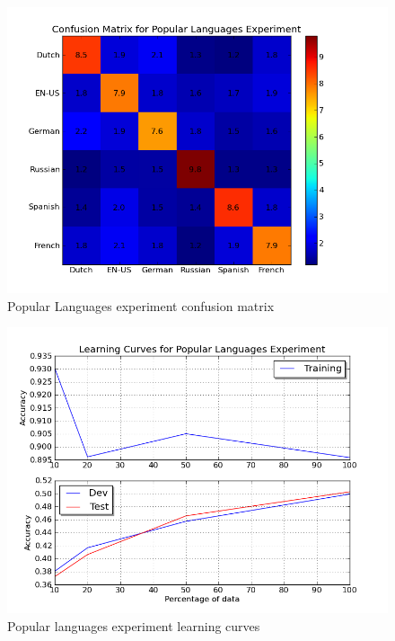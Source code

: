 \documentclass[11pt]{article}
\begin{document}
\begin{figure}[htp]
\centering
\includegraphics[scale=0.45]{popular_cfm.png}
\caption{Popular Languages experiment confusion matrix}
\label{pop_cfm}
\end{figure}

\begin{figure}[htp]
\centering
\includegraphics[scale=0.45]{popular_lc.png}
\caption{Popular languages experiment learning curves}
\label{pop_lc}
\end{figure}
		
\end{document}
